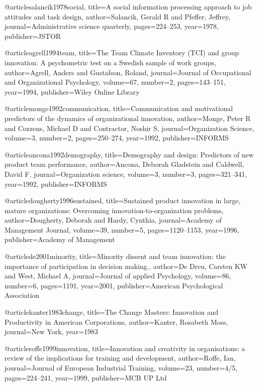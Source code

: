@article{salancik1978social,
  title={A social information processing approach to job attitudes and task design},
  author={Salancik, Gerald R and Pfeffer, Jeffrey},
  journal={Administrative science quarterly},
  pages={224--253},
  year={1978},
  publisher={JSTOR}
}

@article{agrell1994team,
  title={The Team Climate Inventory (TCI) and group innovation: A psychometric test on a Swedish sample of work groups},
  author={Agrell, Anders and Gustafson, Roland},
  journal={Journal of Occupational and Organizational Psychology},
  volume={67},
  number={2},
  pages={143--151},
  year={1994},
  publisher={Wiley Online Library}
}

@article{monge1992communication,
  title={Communication and motivational predictors of the dynamics of organizational innovation},
  author={Monge, Peter R and Cozzens, Michael D and Contractor, Noshir S},
  journal={Organization Science},
  volume={3},
  number={2},
  pages={250--274},
  year={1992},
  publisher={INFORMS}
}

@article{ancona1992demography,
  title={Demography and design: Predictors of new product team performance},
  author={Ancona, Deborah Gladstein and Caldwell, David F},
  journal={Organization science},
  volume={3},
  number={3},
  pages={321--341},
  year={1992},
  publisher={INFORMS}
}

@article{dougherty1996sustained,
  title={Sustained product innovation in large, mature organizations: Overcoming innovation-to-organization problems},
  author={Dougherty, Deborah and Hardy, Cynthia},
  journal={Academy of Management Journal},
  volume={39},
  number={5},
  pages={1120--1153},
  year={1996},
  publisher={Academy of Management}
}

@article{de2001minority,
  title={Minority dissent and team innovation: the importance of participation in decision making.},
  author={De Dreu, Carsten KW and West, Michael A},
  journal={Journal of applied Psychology},
  volume={86},
  number={6},
  pages={1191},
  year={2001},
  publisher={American Psychological Association}
}

@article{kanter1983change,
  title={The Change Masters: Innovation and Productivity in American Corporations},
  author={Kanter, Rosabeth Moss},
  journal={New York},
  year={1983}
}

@article{roffe1999innovation,
  title={Innovation and creativity in organisations: a review of the implications for training and development},
  author={Roffe, Ian},
  journal={Journal of European Industrial Training},
  volume={23},
  number={4/5},
  pages={224--241},
  year={1999},
  publisher={MCB UP Ltd}
}

